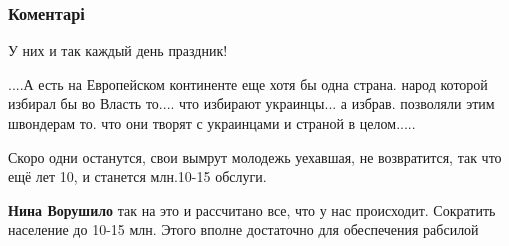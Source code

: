  
 
 
 
 
\subsubsection{Коментарі}

\begin{itemize}
 
У них и так каждый день праздник!

 

....А есть на Европейском континенте еще хотя бы одна страна. народ которой
избирал бы во Власть то.... что избирают украинцы... а избрав. позволяли этим
швондерам то. что они творят с украинцами и страной в целом.....


 
Скоро одни останутся, свои вымрут молодежь уехавшая, не возвратится, так что
ещё лет 10, и станется млн.10-15 обслуги.

\begin{itemize}
 
\textbf{Нина Ворушило} так на это и рассчитано все, что у нас происходит. Сократить население до 10-15 млн. Этого вполне достаточно для обеспечения рабсилой
\end{itemize}


\end{itemize}
